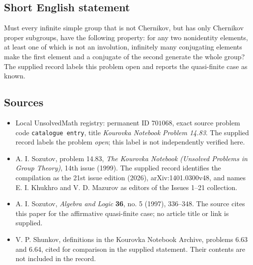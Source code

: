 \documentclass[11pt]{article}
\begin{document}
\subsection{Short English statement}
Must every infinite simple group that is not Chernikov, but has only Chernikov proper subgroups, have the following property: for any two nonidentity elements, at least one of which is not an involution, infinitely many conjugating elements make the first element and a conjugate of the second generate the whole group? The supplied record labels this problem open and reports the quasi-finite case as known.
\subsection{Sources}
\begin{itemize}
\item Local UnsolvedMath registry: permanent ID \(701068\), exact source problem code \texttt{catalogue entry}, title \emph{Kourovka Notebook Problem 14.83}. The supplied record labels the problem \emph{open}; this label is not independently verified here.
\item A. I. Sozutov, problem 14.83, \emph{The Kourovka Notebook (Unsolved Problems in Group Theory)}, 14th issue (1999). The supplied record identifies the compilation as the 21st issue edition (2026), arXiv:1401.0300v48, and names E. I. Khukhro and V. D. Mazurov as editors of the Issues 1--21 collection.
\item A. I. Sozutov, \emph{Algebra and Logic} \textbf{36}, no. 5 (1997), 336--348. The source cites this paper for the affirmative quasi-finite case; no article title or link is supplied.
\item V. P. Shunkov, definitions in the Kourovka Notebook Archive, problems 6.63 and 6.64, cited for comparison in the supplied statement. Their contents are not included in the record.
\end{itemize}
\end{document}
